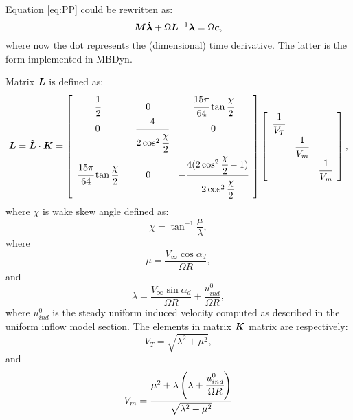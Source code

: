 Equation \ref{eq:PP} could be rewritten as:
\begin{equation}
\bm{M} \dot{\bm{\lambda}} + \Omega \bm{L}^{-1} \bm{\lambda} =
\Omega \bm{c},
\end{equation}
where now the dot represents the (dimensional) time derivative. The latter is the 
form implemented in MBDyn.

Matrix $\bm{L}$ is defined as:
\begin{equation}
\bm{L} = \tilde{\bm{L}} \cdot \bm{K} = 
\left[
\begin{array}{ccc}
\cfrac{1}{2} & 0 & \cfrac{15 \pi}{64} \tan{\cfrac{\chi}{2}} \\
 0 & -\cfrac{4}{2 \cos^2{\cfrac{\chi}{2}}} & 0 \\
\cfrac{15 \pi}{64} \tan{\cfrac{\chi}{2}} & 0 &
-\cfrac{4 ( 2 \cos^2{\cfrac{\chi}{2}} - 1 ) }{2 \cos^2{\cfrac{\chi}{2}}}
\end{array}
\right] \left[
\begin{array}{ccc}
\cfrac{1}{V_T} & & \\
& \cfrac{1}{V_m} & \\
& & \cfrac{1}{V_m}
\end{array}
\right],
\end{equation}
where $\chi$ is wake skew angle defined as:
\begin{equation}
\chi = \tan^{-1}{\frac{\mu}{\lambda}},
\end{equation}
where 
\begin{equation}
\mu = \frac{ V_\infty \cos{\alpha_d}}{\Omega R},
\end{equation}
and
\begin{equation}
\lambda = \frac{ V_\infty \sin{\alpha_d}}{\Omega R} + 
\frac{u_{ind}^{0}}{\Omega R},
\end{equation}
where $u_{ind}^{0}$ is the steady uniform induced velocity
computed as described in the uniform inflow model section.
The elements in matrix $\bm{K}$ matrix are respectively:
\begin{equation}
V_T = \sqrt{\lambda^2 + \mu^2},
\end{equation}
and
\begin{equation}
V_m = \frac{\mu^2 + \lambda \left( \lambda + \cfrac{u_{ind}^{0}}{\Omega R} \right)}
{\sqrt{\lambda^2 + \mu^2}}
\end{equation}


